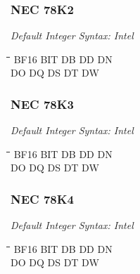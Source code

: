 \subsubsection{NEC 78K2}

{\em Default Integer Syntax: Intel}

{\tt\begin{tabbing}
\hspace{3cm}\=\hspace{3cm}\=\hspace{3cm}\=\hspace{3cm}\=\kill
BF16       \> BIT        \> DB          \> DD           \> DN \\
DO         \> DQ         \> DS          \> DT           \> DW \\
\end{tabbing}}

\subsubsection{NEC 78K3}

{\em Default Integer Syntax: Intel}

{\tt\begin{tabbing}
\hspace{3cm}\=\hspace{3cm}\=\hspace{3cm}\=\hspace{3cm}\=\kill
BF16       \> BIT        \> DB          \> DD           \> DN \\
DO         \> DQ         \> DS          \> DT           \> DW \\
\end{tabbing}}

\subsubsection{NEC 78K4}

{\em Default Integer Syntax: Intel}

{\tt\begin{tabbing}
\hspace{3cm}\=\hspace{3cm}\=\hspace{3cm}\=\hspace{3cm}\=\kill
BF16       \> BIT        \> DB          \> DD          \> DN \\
DO         \> DQ         \> DS          \> DT          \> DW \\
\end{tabbing}}

